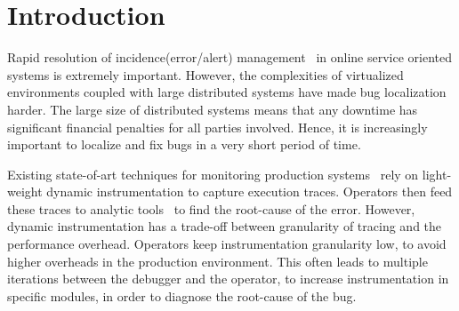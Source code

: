 
\section{Introduction}
\label{sec:intro}

Rapid resolution of incidence(error/alert) management~\cite{sasase2013} in online service oriented systems is extremely important.
However, the complexities of virtualized environments coupled with large distributed systems have made bug localization harder. 
The large size of distributed systems means that any downtime has significant financial penalties for all parties involved.
Hence, it is increasingly important to localize and fix bugs in a very short period of time.

Existing state-of-art techniques for monitoring production systems~\cite{dtrace, iProbe, winetw} rely on light-weight dynamic instrumentation to capture execution traces. 
Operators then feed these traces to analytic tools~\cite{magpie,clue} to find the root-cause of the error.
However, dynamic instrumentation has a trade-off between granularity of tracing and the performance overhead. 
Operators keep instrumentation granularity low, to avoid higher overheads in the production environment.
This often leads to multiple iterations between the debugger and the operator, to increase instrumentation in specific modules, in order to diagnose the root-cause of the bug. 

